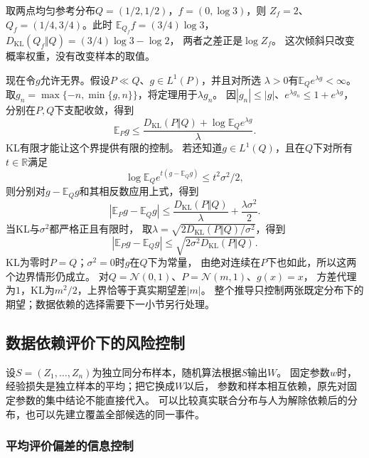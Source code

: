 取两点均匀参考分布\(Q=(1/2,1/2)\)，\(f=(0,\log3)\)，则
\(Z_f=2\)、\(Q_f=(1/4,3/4)\)。此时
\(\mathbb E_{Q_f}f=(3/4)\log3\)，
\(D_{\mathrm{KL}}(Q_f\Vert Q)=(3/4)\log3-\log2\)，
两者之差正是\(\log Z_f\)。
这次倾斜只改变概率权重，没有改变样本的取值。

现在令\(g\)允许无界。假设\(P\ll Q\)、\(g\in L^1(P)\)，并且对所选
\(\lambda>0\)有\(\mathbb E_Qe^{\lambda g}<\infty\)。
取\(g_n=\max\{-n,\min\{g,n\}\}\)，将定理用于\(\lambda g_n\)。
因\(|g_n|\leq|g|\)、\(e^{\lambda g_n}\leq1+e^{\lambda g}\)，
分别在\(P,Q\)下支配收敛，得到
\begin{equation}
  \mathbb E_Pg
  \leq\frac{D_{\mathrm{KL}}(P\Vert Q)+\log\mathbb E_Qe^{\lambda g}}{\lambda}.
  \label{eq:information-change-measure-expectation}
\end{equation}
KL有限才能让这个界提供有限的控制。
若还知道\(g\in L^1(Q)\)，且在\(Q\)下对所有\(t\in\mathbb R\)满足
\[
  \log\mathbb E_Qe^{t(g-\mathbb E_Qg)}\leq t^2\sigma^2/2,
\]
则分别对\(g-\mathbb E_Qg\)和其相反数应用上式，得到
\[
  |\mathbb E_Pg-\mathbb E_Qg|
  \leq\frac{D_{\mathrm{KL}}(P\Vert Q)}{\lambda}+\frac{\lambda\sigma^2}{2}.
\]
当KL与\(\sigma^2\)都严格正且有限时，
取\(\lambda=\sqrt{2D_{\mathrm{KL}}(P\Vert Q)/\sigma^2}\)，得到
\begin{equation}
  |\mathbb E_Pg-\mathbb E_Qg|
  \leq\sqrt{2\sigma^2D_{\mathrm{KL}}(P\Vert Q)}.
  \label{eq:information-subgaussian-change-measure}
\end{equation}
KL为零时\(P=Q\)；\(\sigma^2=0\)时\(g\)在\(Q\)下为常量，
由绝对连续在\(P\)下也如此，所以这两个边界情形仍成立。
对\(Q=\mathcal N(0,1)\)、\(P=\mathcal N(m,1)\)、\(g(x)=x\)，
方差代理为\(1\)，KL为\(m^2/2\)，上界恰等于真实期望差\(|m|\)。
整个推导只控制两张既定分布下的期望；数据依赖的选择需要下一小节另行处理。

\subsection{数据依赖评价下的风险控制}
\label{sec:information-data-dependent-evaluation}

设\(S=(Z_1,\ldots,Z_n)\)为独立同分布样本，随机算法根据\(S\)输出\(W\)。
固定参数\(w\)时，经验损失是独立样本的平均；把它换成\(W\)以后，
参数和样本相互依赖，原先对固定参数的集中结论不能直接代入。
可以比较真实联合分布与人为解除依赖后的分布，也可以先建立覆盖全部候选的同一事件。

\subsubsection{平均评价偏差的信息控制}
\label{sec:information-mi-generalization}

